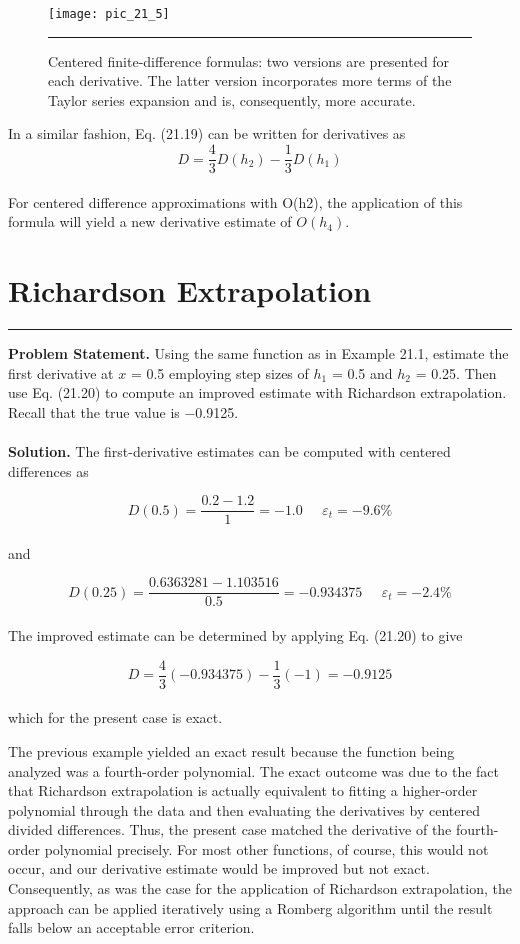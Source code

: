\documentclass[../main.tex]{subfiles}
\begin{document}
\begin{figure}[hbt!]
	\centering
	\texttt{[image: pic\_21\_5]}
	\caption{\textsf{Centered finite-difference formulas: two versions are presented for each derivative. The latter
version incorporates more terms of the Taylor series expansion and is, consequently, more
accurate.
}} \hrule
	\label{pic.21.5}
\end{figure}
In a similar fashion, Eq. (21.19) can be written for derivatives as
\begin{equation}
	\tag{21.20}
	D= \dfrac{4}{3}D(h_{2}) - \dfrac{1}{3}D(h_{1})
\end{equation}\\
For centered difference approximations with O(h2), the application of this formula will
yield a new derivative estimate of $O(h_{4})$.

\vspace{0,6in}
\section{Richardson Extrapolation}
\vspace{0,1in}
\hrule
\vspace{0,1in}
\textbf{Problem Statement.} Using the same function as in Example 21.1, estimate the first derivative at $x$ = 0.5 employing step sizes of $h_{1}$ = 0.5 and $h_{2}$ = 0.25. Then use Eq. (21.20)
to compute an improved estimate with Richardson extrapolation. Recall that the true value
is −0.9125.\\
\vspace{0.2in}\\
\textbf{Solution.} The first-derivative estimates can be computed with centered differences as

	$$D(0.5) = \dfrac{0.2 - 1.2}{1} = - 1.0 \; \; \; \; \; \varepsilon_{t} = -9.6\%$$\\
and

	$$D(0.25) = \dfrac{0.6363281 - 1.103516}{0.5} = -0.934375 \; \; \; \; \; \varepsilon_{t} = -2.4\%$$\\
The improved estimate can be determined by applying Eq. (21.20) to give

	$$D = \dfrac{4}{3}(-0.934375) -\dfrac{1}{3}(-1) = -0.9125$$\\
which for the present case is exact.
\vspace{0.2in}

The previous example yielded an exact result because the function being analyzed was
a fourth-order polynomial. The exact outcome was due to the fact that Richardson extrapolation is actually equivalent to fitting a higher-order polynomial through the data and then
evaluating the derivatives by centered divided differences. Thus, the present case matched
the derivative of the fourth-order polynomial precisely. For most other functions, of course,
this would not occur, and our derivative estimate would be improved but not exact. Consequently, as was the case for the application of Richardson extrapolation, the approach can
be applied iteratively using a Romberg algorithm until the result falls below an acceptable
error criterion. 
\end{document}
